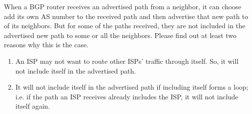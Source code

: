 \documentclass{report}
\begin{document}
\mktitle

\begin{problem}

When a BGP router receives an advertised path from a neighbor, it can choose add its own AS number to the received path and then advertise that new path to of its neighbors. But for some of the paths received, they are not included in the advertised new path to some or all the neighbors. Please find out at least two reasons why this is the case.

\begin{answer}{40em}
    \begin{enumerate}
        \item An ISP may not want to route other ISPs' traffic through itself. So, it will not include
            itself in the advertised path.
        \item It will not include itself in the advertised path if including itself forms a loop; i.e.
            if the path an ISP receives already includes the ISP, it will not include itself again.
    \end{enumerate}
\end{answer}
\end{problem}
\end{document}
